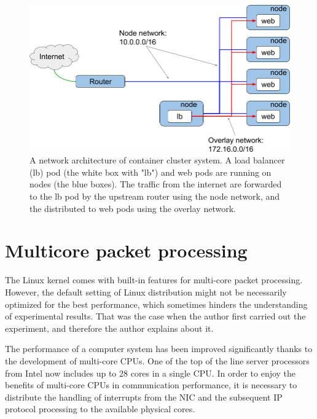 \begin{figure}[h]
  \centering
  \includegraphics[width=0.95\columnwidth]{Figs/overlay.png}

  \par\bigskip
  \centering
  \begin{minipage}{0.9\columnwidth}
    \caption[A network architecture of container cluster system]{
      A network architecture of container cluster system.
      A load balancer (lb) pod (the white box with "lb") and web pods are running on nodes (the blue boxes).
      The traffic from the internet are forwarded to the lb pod by the upstream router using the node network,
      and the distributed to web pods using the overlay network.
    }
    \label{fig:overlay}
  \end{minipage}
  
\end{figure}

\FloatBarrier

\section{Multicore packet processing}

The Linux kernel comes with built-in features for multi-core packet processing.
However, the default setting of Linux distribution might not be necessarily optimized for the best performance, which sometimes hinders the understanding of experimental results.
That was the case when the author first carried out the experiment, and therefore the author explains about it.

The performance of a computer system has been improved significantly thanks to the development of multi-core CPUs.
One of the top of the line server processors from Intel now includes up to 28 cores in a single CPU.
In order to enjoy the benefits of multi-core CPUs in communication performance,
it is necessary to distribute the handling of interrupts from the NIC and the subsequent IP protocol processing to the available physical cores.

